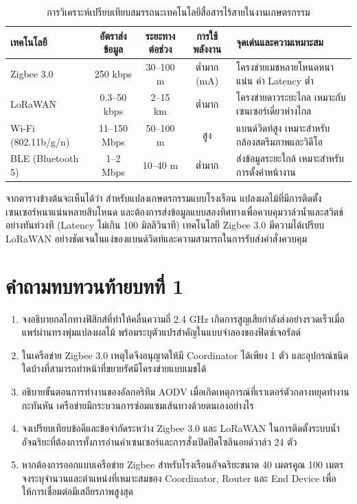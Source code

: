 \begin{table}[H]
\caption{การวิเคราะห์เปรียบเทียบสมรรถนะเทคโนโลยีสื่อสารไร้สายในงานเกษตรกรรม}
\label{tab:wireless_tech_comparison}
\centering
\small
\begin{tabularx}{\textwidth}{p{2.6cm} c c c >{\raggedright\arraybackslash}X}
\toprule
\textbf{เทคโนโลยี} & \textbf{อัตราส่งข้อมูล} & \textbf{ระยะทางต่อช่วง} & \textbf{การใช้พลังงาน} & \textbf{จุดเด่นและความเหมาะสม} \\
\midrule
Zigbee 3.0 & 250 kbps & 30--100 m & ต่ำมาก (mA) & โครงข่ายเมชหลายโหนดหนาแน่น ค่า Latency ต่ำ \\
LoRaWAN & 0.3--50 kbps & 2--15 km & ต่ำมาก & โครงข่ายดาวระยะไกล เหมาะกับเซนเซอร์เดี่ยวห่างไกล \\
Wi-Fi (802.11b/g/n) & 11--150 Mbps & 50--100 m & สูง & แบนด์วิดท์สูง เหมาะสำหรับกล้องสตรีมภาพและวิดีโอ \\
BLE (Bluetooth 5) & 1--2 Mbps & 10--40 m & ต่ำมาก & ส่งข้อมูลระยะใกล้ เหมาะสำหรับการตั้งค่าหน้างาน \\
\bottomrule
\end{tabularx}
\end{table}

จากตารางข้างต้นจะเห็นได้ว่า สำหรับแปลงเกษตรกรรมแบบโรงเรือน แปลงผลไม้ที่มีการติดตั้งเซนเซอร์หนาแน่นหลายสิบโหนด และต้องการส่งข้อมูลแบบสองทิศทางเพื่อควบคุมวาล์วน้ำและสวิตช์อย่างทันท่วงที (Latency ไม่เกิน 100 มิลลิวินาที) เทคโนโลยี Zigbee 3.0 มีความได้เปรียบ LoRaWAN อย่างชัดเจนในแง่ของแบนด์วิดท์และความสามารถในการรับส่งคำสั่งควบคุม

\clearpage

\section*{คำถามทบทวนท้ายบทที่ 1}

\begin{enumerate}
    \item จงอธิบายกลไกทางฟิสิกส์ที่ทำให้คลื่นความถี่ 2.4 GHz เกิดการสูญเสียกำลังส่งอย่างรวดเร็วเมื่อแพร่ผ่านทรงพุ่มแปลงผลไม้ พร้อมระบุตัวแปรสำคัญในแบบจำลองของฟิตซ์เจอรัลด์
    \item ในเครือข่าย Zigbee 3.0 เหตุใดจึงอนุญาตให้มี Coordinator ได้เพียง 1 ตัว และอุปกรณ์ชนิดใดบ้างที่สามารถทำหน้าที่ขยายรัศมีโครงข่ายแบบเมชได้
    \item อธิบายขั้นตอนการทำงานของอัลกอริทึม AODV เมื่อเกิดเหตุการณ์ที่เราเตอร์ตัวกลางหยุดทำงานกะทันหัน เครือข่ายมีกระบวนการซ่อมแซมเส้นทางด้วยตนเองอย่างไร
    \item จงเปรียบเทียบข้อดีและข้อจำกัดระหว่าง Zigbee 3.0 และ LoRaWAN ในการติดตั้งระบบน้ำอัจฉริยะที่ต้องการทั้งการอ่านค่าเซนเซอร์และการสั่งเปิดปิดโซลินอยด์วาล์ว 24 ตัว
    \item หากต้องการออกแบบเครือข่าย Zigbee สำหรับโรงเรือนอัจฉริยะขนาด 40 เมตรคูณ 100 เมตร จงระบุจำนวนและตำแหน่งที่เหมาะสมของ Coordinator, Router และ End Device เพื่อให้การเชื่อมต่อมีเสถียรภาพสูงสุด
\end{enumerate}

\clearpage
